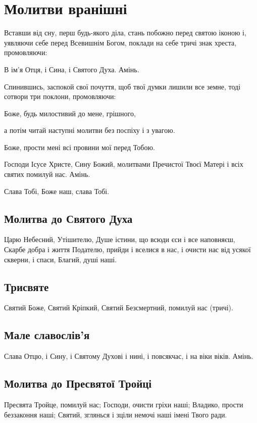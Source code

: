 \documentclass[chapters.tex]{subfiles}
\begin{document}
\chapter{Молитви вранішні}
Вставши від сну, перш будь-якого діла, стань побожно перед святою іконою і, уявляючи себе перед Всевишнім Богом, поклади на себе тричі знак хреста, промовляючи:

В ім’я Отця, і Сина, і Святого Духа. Амінь.

Спинившись, заспокой свої почуття, щоб твої думки лишили все земне, тоді сотвори три поклони, промовляючи:

Боже, будь милостивий до мене, грішного,

а потім читай наступні молитви без поспіху і з увагою.

Боже, прости мені всі провини мої перед Тобою.

Господи Ісусе Христе, Сину Божий, молитвами Пречистої Твоєї Матері і всіх святих помилуй нас. Амінь.

Слава Тобі, Боже наш, слава Тобі.

\section{Молитва до Святого Духа}

Царю Небесний, Утішителю, Душе істини, що всюди єси і все наповняєш, Скарбе добра і життя Подателю, прийди і вселися в нас, і очисти нас від усякої скверни, і спаси, Благий, душі наші.

\section{Трисвяте}

Святий Боже, Святий Кріпкий, Святий Безсмертний, помилуй нас (тричі).

\section{Мале славослів’я}

Слава Отцю, і Сину, і Святому Духові і нині, і повсякчас, і на віки віків. Амінь.

\section{Молитва до Пресвятої Тройці}

Пресвята Тройце, помилуй нас; Господи, очисти гріхи наші; Владико, прости беззаконня наші; Святий, зглянься і зціли немочі наші імені Твого ради.
\end{document}
